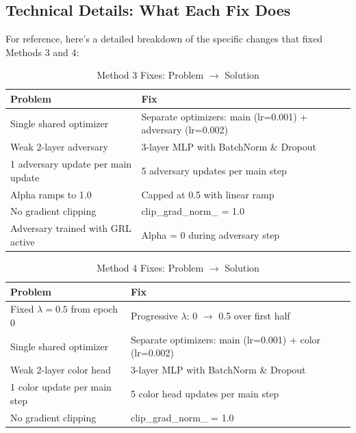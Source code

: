 \documentclass[9pt,a4paper,twocolumn,twoside]{tau-class/tau}
\begin{document}
    \subsection{Technical Details: What Each Fix Does}

        For reference, here's a detailed breakdown of the specific changes that fixed Methods 3 and 4:

        \begin{table}[t]
            \caption{Method 3 Fixes: Problem $\rightarrow$ Solution}
            \label{tab:day10_m3_fixes}
            \centering
            \tiny
            \begin{tabular}{@{}p{0.1cm}p{0.1cm}@{}}    
            \toprule
            \textbf{Problem} & \textbf{Fix} \\
            \midrule
            Single shared optimizer & Separate optimizers: main (lr=0.001) + adversary (lr=0.002) \\
            Weak 2-layer adversary & 3-layer MLP with BatchNorm \& Dropout \\
            1 adversary update per main update & 5 adversary updates per main step \\
            Alpha ramps to 1.0 & Capped at 0.5 with linear ramp \\
            No gradient clipping & clip\_grad\_norm\_ = 1.0 \\
            Adversary trained with GRL active & Alpha = 0 during adversary step \\
            \bottomrule
            \end{tabular}
        \end{table}

        \begin{table}[t]
            \caption{Method 4 Fixes: Problem $\rightarrow$ Solution}
            \label{tab:day10_m4_fixes}
            \centering
            \tiny
            \begin{tabular}{@{}p{0.1cm}p{0.1cm}@{}}  
            \toprule
            \textbf{Problem} & \textbf{Fix} \\
            \midrule
            Fixed $\lambda = 0.5$ from epoch 0 & Progressive $\lambda$: 0 $\rightarrow$ 0.5 over first half \\
            Single shared optimizer & Separate optimizers: main (lr=0.001) + color (lr=0.002) \\
            Weak 2-layer color head & 3-layer MLP with BatchNorm \& Dropout \\
            1 color update per main step & 5 color head updates per main step \\
            No gradient clipping & clip\_grad\_norm\_ = 1.0 \\
            \bottomrule
            \end{tabular}
        \end{table}
\end{document}
